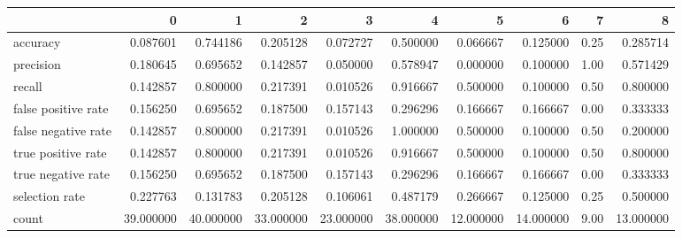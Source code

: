 \begin{tabular}{lrrrrrrrrr}
\toprule
{} &          0 &          1 &          2 &          3 &          4 &          5 &          6 &     7 &          8 \\
\midrule
accuracy            &   0.087601 &   0.744186 &   0.205128 &   0.072727 &   0.500000 &   0.066667 &   0.125000 &  0.25 &   0.285714 \\
precision           &   0.180645 &   0.695652 &   0.142857 &   0.050000 &   0.578947 &   0.000000 &   0.100000 &  1.00 &   0.571429 \\
recall              &   0.142857 &   0.800000 &   0.217391 &   0.010526 &   0.916667 &   0.500000 &   0.100000 &  0.50 &   0.800000 \\
false positive rate &   0.156250 &   0.695652 &   0.187500 &   0.157143 &   0.296296 &   0.166667 &   0.166667 &  0.00 &   0.333333 \\
false negative rate &   0.142857 &   0.800000 &   0.217391 &   0.010526 &   1.000000 &   0.500000 &   0.100000 &  0.50 &   0.200000 \\
true positive rate  &   0.142857 &   0.800000 &   0.217391 &   0.010526 &   0.916667 &   0.500000 &   0.100000 &  0.50 &   0.800000 \\
true negative rate  &   0.156250 &   0.695652 &   0.187500 &   0.157143 &   0.296296 &   0.166667 &   0.166667 &  0.00 &   0.333333 \\
selection rate      &   0.227763 &   0.131783 &   0.205128 &   0.106061 &   0.487179 &   0.266667 &   0.125000 &  0.25 &   0.500000 \\
count               &  39.000000 &  40.000000 &  33.000000 &  23.000000 &  38.000000 &  12.000000 &  14.000000 &  9.00 &  13.000000 \\
\bottomrule
\end{tabular}
